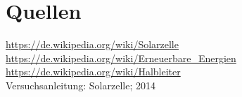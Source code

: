 \documentclass[numbers=noenddot,12pt,a4paper]{scrartcl}
\begin{document}
\section{Quellen}
\url{https://de.wikipedia.org/wiki/Solarzelle} \\
\url{https://de.wikipedia.org/wiki/Erneuerbare_Energien} \\
\url{https://de.wikipedia.org/wiki/Halbleiter} \\
Versuchsanleitung: Solarzelle; 2014
\end{document}
